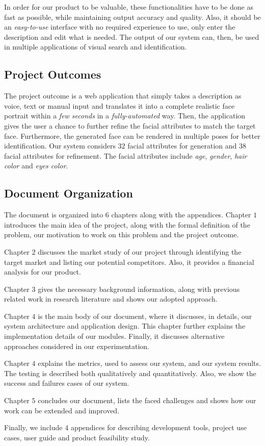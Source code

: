 In order for our product to be valuable, these functionalities have to be done as fast as possible, while maintaining output accuracy and quality. Also, it should be an \emph{easy-to-use} interface with no required experience to use, only enter the description and edit what is needed. The output of our system can, then, be used in multiple applications of visual search and identification.

\subsection{Project Outcomes}
The project outcome is a web application that simply takes a description as voice, text or manual input and translates it into a complete realistic face portrait within a \emph{few seconds} in a \emph{fully-automated} way. Then, the application gives the user a chance to further refine the facial attributes to match the target face. Furthermore, the generated face can be rendered in multiple poses for better identification. Our system considers $32$ facial attributes for generation and $38$ facial attributes for refinement. The facial attributes include \emph{age}, \emph{gender}, \emph{hair color} and \emph{eyes color}. 

\subsection{Document Organization}
The document is organized into $6$ chapters along with the appendices. Chapter $1$ introduces the main idea of the project, along with the formal definition of the problem, our motivation to work on this problem and the project outcome.

Chapter $2$ discusses the market study of our project through identifying the target market and listing our potential competitors. Also, it provides a financial analysis for our product.

Chapter $3$ gives the necessary background information, along with previous related work in research literature and shows our adopted approach.

Chapter $4$ is the main body of our document, where it discusses, in details, our system architecture and application design. This chapter further explains the implementation details of our modules. Finally, it discusses alternative approaches considered in our experimentation.

Chapter $4$ explains the metrics, used to assess our system, and our system results. The testing is described both qualitatively and quantitatively. Also, we show the success and failures cases of our system.

Chapter $5$ concludes our document, lists the faced challenges and shows how our work can be extended and improved.

Finally, we include $4$ appendices for describing development tools, project use cases, user guide and product feasibility study.
